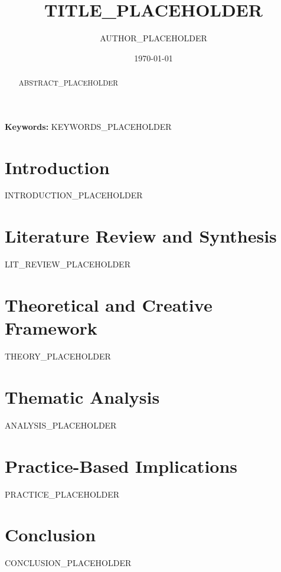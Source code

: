 \documentclass[12pt, a4paper]{article}
\title{\textbf{TITLE_PLACEHOLDER}}
\author{AUTHOR_PLACEHOLDER}
\date{\today}
\begin{document}
\maketitle

\begin{abstract}
ABSTRACT_PLACEHOLDER
\end{abstract}

\noindent \textbf{Keywords:} KEYWORDS_PLACEHOLDER

\newpage

\section{Introduction}
INTRODUCTION_PLACEHOLDER

\section{Literature Review and Synthesis}
LIT_REVIEW_PLACEHOLDER

\section{Theoretical and Creative Framework}
THEORY_PLACEHOLDER

\section{Thematic Analysis}
ANALYSIS_PLACEHOLDER

\section{Practice-Based Implications}
PRACTICE_PLACEHOLDER

\section{Conclusion}
CONCLUSION_PLACEHOLDER

\newpage


\end{document}

